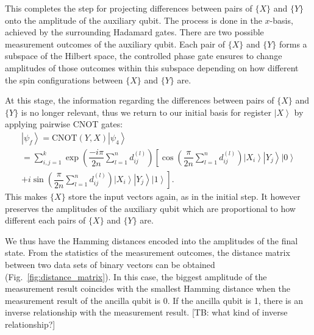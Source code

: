 \documentclass[pra,showkeys,twocolumn,showpacs]{revtex4-1}
\begin{document}
%
This completes the step for projecting differences between pairs of $\{X\}$ and $\{Y\}$ onto the amplitude of the auxiliary qubit. The process is done in the $x$-basis, achieved by the surrounding Hadamard gates. There are two possible measurement outcomes of the auxiliary qubit.  Each pair of $\{X\}$ and $\{Y\}$ forms a subspace of the Hilbert space, the controlled phase gate ensures to change amplitudes of those outcomes within this subspace depending on how different the spin configurations between $\{X\}$ and $\{Y\}$ are.

At this stage, the information regarding the differences between pairs of $\{X\}$ and $\{Y\}$ is no longer relevant, thus we return to our initial basis for register $\left| X \right\rangle$ by applying pairwise CNOT gates:
%
\begin{multline}
    \left| \psi_f \right\rangle = 
    \mathrm{CNOT} (Y,X)\left| \psi_4 \right\rangle \\=  
    \sum\limits_{i, j=1}^{k} 
    \exp \left(\dfrac{-i \pi}{2n}\sum\limits_{l=1}^n d^{(l)}_{ij} \right)
				\left[ \cos\left(\dfrac{\pi}{2n}\sum\limits_{l=1}^n d^{(l)}_{ij} \right)
        \left| X_i \right\rangle 
        \left| Y_j \right\rangle 
        \left| 0 \right\rangle\right.
        \\+
        \left. i \sin\left(\dfrac{\pi}{2n}\sum\limits_{l=1}^n d^{(l)}_{ij} \right)
        \left| X_i \right\rangle 
        \left| Y_j \right\rangle 
        \left| 1 \right\rangle\right] .
\end{multline}
%
This makes $\{X\}$ store the input vectors again, as in the initial step. It however preserves the amplitudes of the auxiliary qubit which are proportional to how different each pairs of $\{X\}$ and $\{Y\}$ are.

We thus have the Hamming distances encoded into the amplitudes of the final state. From the statistics of the measurement outcomes, the distance matrix between two data sets of binary vectors can be obtained (Fig.~\ref{fig:distance_matrix}). In this case, the biggest amplitude of the measurement result coincides with the smallest Hamming distance when the measurement result of the ancilla qubit is 0. 
If the ancilla qubit is 1, there is an inverse relationship with the measurement result.  [TB: what kind of inverse relationship?]
\end{document}
